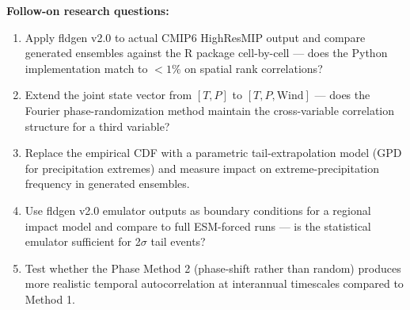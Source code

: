 \noindent\textbf{Follow-on research questions:}
\begin{enumerate}[leftmargin=1.6em,itemsep=0.2em,topsep=0.2em,label=Q\arabic*.]
\item Apply fldgen v2.0 to actual CMIP6 HighResMIP output and compare generated ensembles against the R package cell-by-cell --- does the Python implementation match to $<1\%$ on spatial rank correlations?
\item Extend the joint state vector from $[T, P]$ to $[T, P, \mathrm{Wind}]$ --- does the Fourier phase-randomization method maintain the cross-variable correlation structure for a third variable?
\item Replace the empirical CDF with a parametric tail-extrapolation model (GPD for precipitation extremes) and measure impact on extreme-precipitation frequency in generated ensembles.
\item Use fldgen v2.0 emulator outputs as boundary conditions for a regional impact model and compare to full ESM-forced runs --- is the statistical emulator sufficient for 2$\sigma$ tail events?
\item Test whether the Phase Method 2 (phase-shift rather than random) produces more realistic temporal autocorrelation at interannual timescales compared to Method 1.
\end{enumerate}

